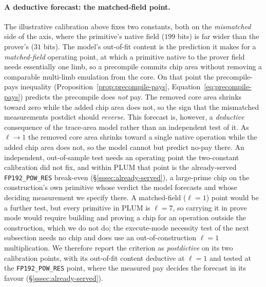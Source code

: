 \paragraph{A deductive forecast: the matched-field point.}
The illustrative calibration above fixes two constants, both on the \emph{mismatched} side of the axis, where the primitive's native field ($199$ bits) is far wider than the prover's ($31$ bits). The model's out-of-fit content is the prediction it makes for a \emph{matched-field} operating point, at which a primitive native to the prover field needs essentially one limb, so a precompile commits chip area without removing a comparable multi-limb emulation from the core. On that point the precompile-pays inequality (Proposition~\ref{prop:precompile-pays}, Equation~\eqref{eq:precompile-pays}) predicts the precompile does \emph{not} pay. The removed core area shrinks toward zero while the added chip area does not, so the sign that the mismatched measurements postdict should \emph{reverse}. This forecast is, however, a \emph{deductive} consequence of the trace-area model rather than an independent test of it. As $\ell\to1$ the removed core area shrinks toward a single native operation while the added chip area does not, so the model cannot but predict no-pay there. An independent, out-of-sample test needs an operating point the two-constant calibration did not fix, and within PLUM that point is the already-served \texttt{FP192\_POW\_RES} break-even (\S\ref{sssec:already-served}), a large-prime chip on the construction's own primitive whose verdict the model forecasts and whose deciding measurement we specify there. A matched-field ($\ell=1$) point would be a further test, but every primitive in PLUM is $\ell=7$, so carrying it in prove mode would require building and proving a chip for an operation outside the construction, which we do not do; the execute-mode necessity test of the next subsection needs no chip and does use an out-of-construction $\ell=1$ multiplication. We therefore report the criterion as \emph{postdictive} on its two calibration points, with its out-of-fit content deductive at $\ell=1$ and tested at the \texttt{FP192\_POW\_RES} point, where the measured pay decides the forecast in its favour (\S\ref{sssec:already-served}).

